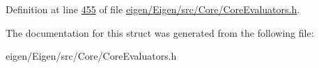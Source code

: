 Definition at line \hyperlink{eigen_2_eigen_2src_2_core_2_core_evaluators_8h_source_l00455}{455} of file \hyperlink{eigen_2_eigen_2src_2_core_2_core_evaluators_8h_source}{eigen/\+Eigen/src/\+Core/\+Core\+Evaluators.\+h}.



The documentation for this struct was generated from the following file\+:\begin{DoxyCompactItemize}
\item 
eigen/\+Eigen/src/\+Core/\+Core\+Evaluators.\+h\end{DoxyCompactItemize}
